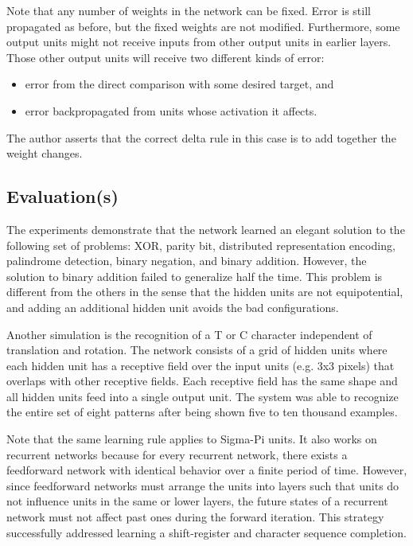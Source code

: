 \documentclass[]{article}
\begin{document}
Note that any number of weights in the network can be fixed. Error is
still propagated as before, but the fixed weights are not modified.
Furthermore, some output units might not receive inputs from other
output units in earlier layers. Those other output units will receive
two different kinds of error:

\begin{itemize}
\item
  error from the direct comparison with some desired target, and
\item
  error backpropagated from units whose activation it affects.
\end{itemize}

The author asserts that the correct delta rule in this case is to add
together the weight changes.

\subsection{Evaluation(s)}\label{header-n35}

The experiments demonstrate that the network learned an elegant solution
to the following set of problems: XOR, parity bit, distributed
representation encoding, palindrome detection, binary negation, and
binary addition. However, the solution to binary addition failed to
generalize half the time. This problem is different from the others in
the sense that the hidden units are not equipotential, and adding an
additional hidden unit avoids the bad configurations.

Another simulation is the recognition of a T or C character independent
of translation and rotation. The network consists of a grid of hidden
units where each hidden unit has a receptive field over the input units
(e.g. 3x3 pixels) that overlaps with other receptive fields. Each
receptive field has the same shape and all hidden units feed into a
single output unit. The system was able to recognize the entire set of
eight patterns after being shown five to ten thousand examples.

Note that the same learning rule applies to Sigma-Pi units. It also
works on recurrent networks because for every recurrent network, there
exists a feedforward network with identical behavior over a finite
period of time. However, since feedforward networks must arrange the
units into layers such that units do not influence units in the same or
lower layers, the future states of a recurrent network must not affect
past ones during the forward iteration. This strategy successfully
addressed learning a shift-register and character sequence completion.
\end{document}

